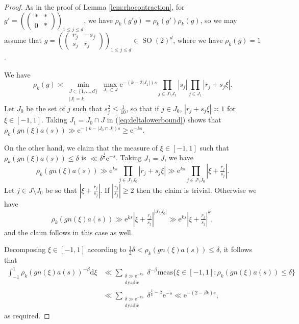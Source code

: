 \documentclass[12pt]{amsart}
\theoremstyle{definition}
\theoremstyle{remark}
\numberwithin{equation}{section}
\newcommand{\dd}{\mathrm{d}}
\newcommand{\e}{\mathrm{e}}
\newcommand{\SO}{\operatorname{SO}}
\begin{document}
\begin{proof}
  As in the proof of Lemma \ref{lem:rhocontraction}, for $g' = \left(\begin{pmatrix}    * & * \\
    0 & * 
  \end{pmatrix}
  \right)_{\!\!1\leq j\leq d}$, we have $\rho_k(g'g) = \rho_k(g')\rho_k(g)$, so we may assume that $g = \left(\begin{pmatrix}    r_j & -s_j \\
    s_j & r_j
  \end{pmatrix}
  \right)_{\!\!1\leq j\leq d} \in \SO(2)^d$, where we have $\rho_k(g) = 1$.

  We have
  \begin{equation}
    \label{eq:deltalowerbound}
    \rho_k(g) \asymp \min_{\substack{J \subset\{1,\dots, d\} \\ |J|=k}} \max_{J_1 \subset J} \e^{-(k-2|J_1|)s}\prod_{j \in J \setminus J_1} |s_j| \prod_{j \in J_1} |r_j + s_j \xi|.
  \end{equation}
  Let $J_0$ be the set of $j$ such that $s_j^2 \leq \tfrac{1}{10}$, so that if $j \in J_0$, $|r_j + s_j \xi| \asymp 1$ for $\xi \in [-1,1]$.
  Taking $J_1 = J_0 \cap J$ in (\ref{eq:deltalowerbound}) shows that $\rho_k(gn(\xi)a(s)) \gg \e^{-(k-|J_0 \cap J|)s} \geq \e^{-ks}$.

  On the other hand, we claim that the measure of $\xi \in [-1,1]$ such that $\rho_k(gn(\xi)a(s)) \leq \delta $ is $\ll \delta^{\frac{1}{k}} \e^{-s}$.
  Taking $J_1 = J$, we have
  \begin{equation}
    \label{eq:rhoklowerbound}
    \rho_k(gn(\xi)a(s)) \gg \e^{ks} \prod_{j \in J \setminus J_0} |r_j + s_j \xi| \gg \e^{ks} \prod_{j \in J \setminus J_0} |\xi + \tfrac{r_j}{s_j}|. 
  \end{equation}
  Let $j \in J\setminus J_0$ be so that $|\xi + \tfrac{r_j}{s_j}|$. If $|\tfrac{r_j}{s_j}| \geq 2$ then the claim is trivial.
  Otherwise we have
  $$\rho_k(gn(\xi)a(s)) \gg \e^{ks} |\xi + \tfrac{r_j}{s_j}|^{|J \setminus J_0|} \gg \e^{ks} |\xi + \tfrac{r_j}{s_j}|^{k},$$
  and the claim follows in this case as well.

  Decomposing $\xi \in [-1,1]$ according to $\tfrac{1}{2} \delta < \rho_k(gn(\xi)a(s)) \leq \delta $, it follows that
 \begin{equation}
  \begin{split}
    \label{eq:dyadicdecomp2}
    \int_{-1}^1 \rho_k (g n(\xi) a(s))^{-\beta} \dd \xi 
& \ll \sum_{\substack{ \delta \gg \e^{-ks} \\ \mathrm{dyadic}}} \delta^{-\beta} \mathrm{meas}\{ \xi \in [-1,1]: \rho_k(gn(\xi)a(s)) \leq \delta\} \\
 &   \ll \sum_{\substack{ \delta \gg \e^{-ks} \\ \mathrm{dyadic}}} \delta^{\frac{1}{k}-\beta}\e^{-s}  \ll \e^{-(2 - \beta k)s},
  \end{split}
  \end{equation}
  as required. 
\end{proof}
\end{document}

